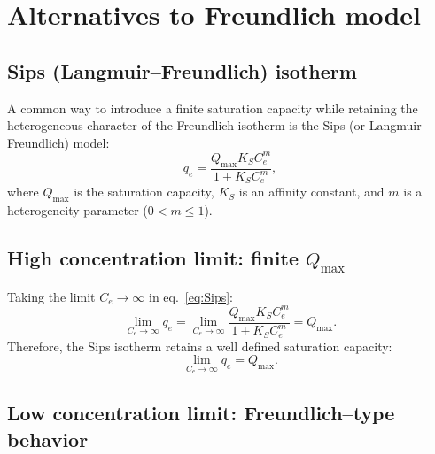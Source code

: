 	\noindent{}
		
	\section{Alternatives to Freundlich model}
	
	\subsection{Sips (Langmuir--Freundlich) isotherm }
	
	A common way to introduce a finite saturation capacity while retaining
	the heterogeneous character of the Freundlich isotherm is the
	Sips (or Langmuir--Freundlich) model:
	\begin{equation}
		q_e = \frac{Q_{\max} K_S C_e^{m}}{1 + K_S C_e^{m}},
		\label{eq:Sips}
	\end{equation}
	where \(Q_{\max}\) is the saturation capacity, \(K_S\) is an affinity
	constant, and \(m\) is a heterogeneity parameter
	(\(0 < m \leq 1\)).
	
	\subsection{High concentration limit: finite \(Q_{\max}\)}
	
	Taking the limit \(C_e \to \infty\) in eq.~\eqref{eq:Sips}:
	\begin{equation}
		\lim_{C_e \to \infty} q_e
		= \lim_{C_e \to \infty}
		\frac{Q_{\max} K_S C_e^{m}}{1 + K_S C_e^{m}}
		= Q_{\max}.
	\end{equation}
	Therefore, the Sips isotherm retains a well defined saturation capacity:
	\begin{equation}
		\boxed{
			\displaystyle \lim_{C_e \to \infty} q_e = Q_{\max}.
		}
	\end{equation}
	
	\subsection{Low concentration limit: Freundlich--type behavior}
	
